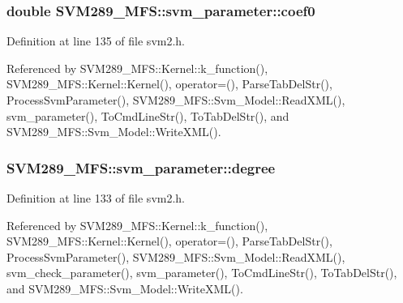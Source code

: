 \subsubsection[{\texorpdfstring{coef0}{coef0}}]{\setlength{\rightskip}{0pt plus 5cm}double S\+V\+M289\+\_\+\+M\+F\+S\+::svm\+\_\+parameter\+::coef0}\hypertarget{struct_s_v_m289___m_f_s_1_1svm__parameter_a3f9f18f528dc4eb5c499e80c6b6af3c2}{}\label{struct_s_v_m289___m_f_s_1_1svm__parameter_a3f9f18f528dc4eb5c499e80c6b6af3c2}


Definition at line 135 of file svm2.\+h.



Referenced by S\+V\+M289\+\_\+\+M\+F\+S\+::\+Kernel\+::k\+\_\+function(), S\+V\+M289\+\_\+\+M\+F\+S\+::\+Kernel\+::\+Kernel(), operator=(), Parse\+Tab\+Del\+Str(), Process\+Svm\+Parameter(), S\+V\+M289\+\_\+\+M\+F\+S\+::\+Svm\+\_\+\+Model\+::\+Read\+X\+M\+L(), svm\+\_\+parameter(), To\+Cmd\+Line\+Str(), To\+Tab\+Del\+Str(), and S\+V\+M289\+\_\+\+M\+F\+S\+::\+Svm\+\_\+\+Model\+::\+Write\+X\+M\+L().

\subsubsection[{\texorpdfstring{degree}{degree}}]{ S\+V\+M289\+\_\+\+M\+F\+S\+::svm\+\_\+parameter\+::degree}\hypertarget{struct_s_v_m289___m_f_s_1_1svm__parameter_a4c45977ba07de7038c6ecd091a7684f0}{}\label{struct_s_v_m289___m_f_s_1_1svm__parameter_a4c45977ba07de7038c6ecd091a7684f0}


Definition at line 133 of file svm2.\+h.



Referenced by S\+V\+M289\+\_\+\+M\+F\+S\+::\+Kernel\+::k\+\_\+function(), S\+V\+M289\+\_\+\+M\+F\+S\+::\+Kernel\+::\+Kernel(), operator=(), Parse\+Tab\+Del\+Str(), Process\+Svm\+Parameter(), S\+V\+M289\+\_\+\+M\+F\+S\+::\+Svm\+\_\+\+Model\+::\+Read\+X\+M\+L(), svm\+\_\+check\+\_\+parameter(), svm\+\_\+parameter(), To\+Cmd\+Line\+Str(), To\+Tab\+Del\+Str(), and S\+V\+M289\+\_\+\+M\+F\+S\+::\+Svm\+\_\+\+Model\+::\+Write\+X\+M\+L().


